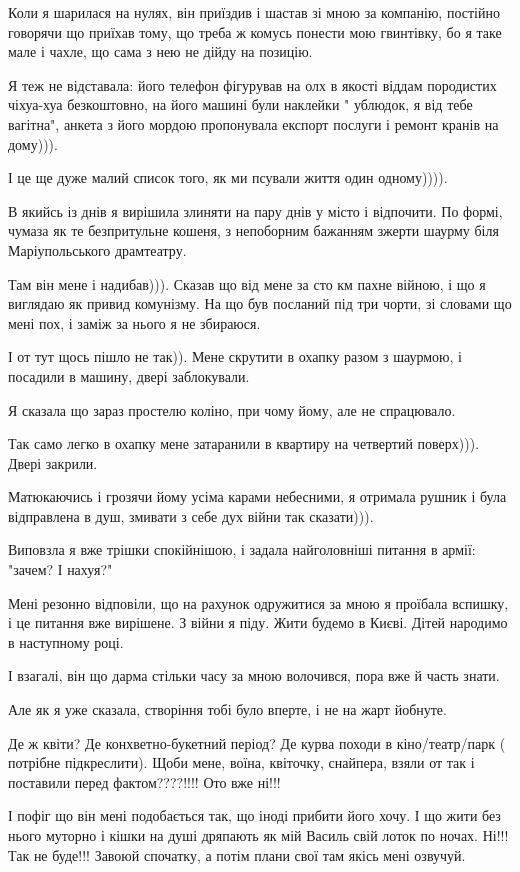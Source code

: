 Коли я шарилася на нулях, він приїздив і шастав зі мною за компанію, постійно
говорячи що приїхав тому, що треба ж комусь понести мою гвинтівку, бо я таке
мале і чахле, що сама з нею не дійду на позицію.

Я теж не відставала: його телефон фігурував на олх в якості віддам породистих
чіхуа-хуа безкоштовно, на його машині були наклейки " ублюдок, я від тебе
вагітна",  анкета з його мордою пропонувала експорт послуги і ремонт кранів на
дому))).

І це ще дуже малий список того, як ми псували життя один одному)))).

В якийсь із днів я вирішила злиняти на пару днів у місто і відпочити. По формі,
чумаза як те безпритульне кошеня, з непоборним бажанням зжерти шаурму біля
Маріупольського драмтеатру.

Там він мене і надибав))). Сказав що від мене за сто км пахне війною, і що я
виглядаю як привид комунізму. На що був посланий під три чорти, зі словами що
мені пох, і заміж за нього я не збираюся.

І от тут щось пішло не так)). Мене скрутити в  охапку разом з шаурмою, і
посадили в машину, двері заблокували.

Я сказала що зараз простелю коліно, при чому йому, але не спрацювало. 

Так само легко в охапку мене затаранили в квартиру на четвертий поверх))).
Двері закрили.

Матюкаючись і грозячи йому усіма карами небесними, я отримала рушник і була
відправлена в душ, змивати з себе дух війни так сказати))). 

Виповзла я вже трішки спокійнішою, і задала найголовніші питання в армії:
"зачем? І нахуя?"

Мені резонно відповіли, що на рахунок одружитися за мною я проїбала вспишку, і
це питання вже вирішене. З війни я піду. Жити будемо в Києві. Дітей народимо в
наступному році.

І взагалі, він що дарма стільки часу за мною волочився, пора вже й часть знати. 

Але як я уже сказала, створіння  тобі було вперте, і не на жарт йобнуте. 

Де ж квіти? Де конхветно-букетний період? Де курва походи в кіно/театр/парк (
потрібне підкреслити). Щоби мене, воїна, квіточку, снайпера, взяли от так і
поставили перед фактом????!!!! Ото вже ні!!!

І пофіг що він мені подобається так, що іноді прибити його хочу. І що жити без
нього муторно і кішки на душі дряпають як мій Василь свій лоток по ночах. Ні!!!
Так не буде!!! Завоюй спочатку, а потім плани свої там якісь мені озвучуй.

